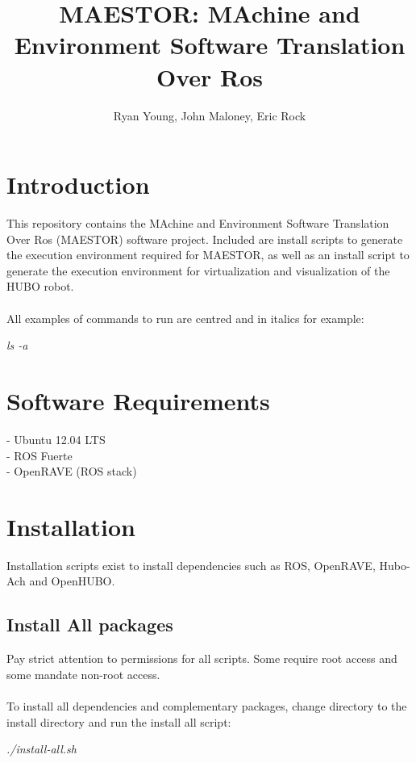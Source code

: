\documentclass[12pt]{article}
\author{Ryan Young, John Maloney, Eric Rock}
\date{}
\begin{document}
\title{MAESTOR: MAchine and Environment Software Translation Over Ros}
\maketitle
\pagebreak
\tableofcontents
\pagebreak
\section{Introduction}

This repository contains the MAchine and Environment Software Translation Over Ros (MAESTOR) software project.
Included are install scripts to generate the execution environment required for MAESTOR, 
as well as an install script to generate the execution environment for virtualization and visualization of the HUBO robot.\\
\noindent\\
All examples of commands to run are centred and in italics for example:
\begin{center}
\textit{ls -a}
\end{center}

\section{Software Requirements}

- Ubuntu 12.04 LTS\\
- ROS Fuerte\\
- OpenRAVE (ROS stack)

\section{Installation}

Installation scripts exist to install dependencies such as ROS, OpenRAVE, Hubo-Ach and OpenHUBO.

\subsection{Install All packages}
Pay strict attention to permissions for all scripts. Some require root access and some mandate non-root access.\\
\noindent
\\To install all dependencies and complementary packages, change directory to the install directory and run the install all script:
\begin{center}
\textit{./install-all.sh}
\end{center}
\pagebreak
\end{document}
